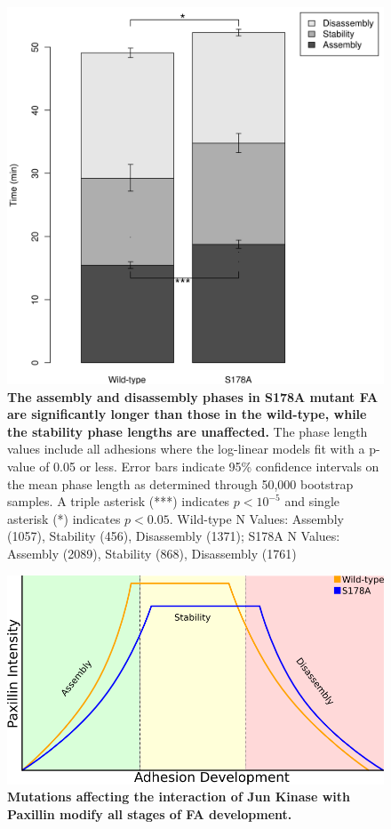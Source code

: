 \begin{figure}[htbp]
\begin{center}
\includegraphics[width=\textwidth]{../figures/lifetimes/adhesion_phase_lifetimes}
\end{center}
\caption{
{\bf The assembly and disassembly phases in S178A mutant FA are significantly
longer than those in the wild-type, while the stability phase lengths are
unaffected.} The phase length values include all adhesions where the log-linear
models fit with a p-value of 0.05 or less.  Error bars indicate 95\% confidence
intervals on the mean phase length as determined through 50,000 bootstrap
samples. A triple asterisk (***) indicates $p<10^{-5}$ and single asterisk (*)
indicates $p<0.05$. Wild-type N Values: Assembly (1057), Stability (456),
Disassembly (1371); S178A N Values: Assembly (2089), Stability (868),
Disassembly (1761)
}
\label{lifetimes}
\end{figure}

\begin{figure}[htbp]
\begin{center}
\includegraphics[width=\textwidth]{../figures/S178A/sample_timecourse}
\end{center}
\caption{
{\bf Mutations affecting the interaction of Jun Kinase with Paxillin modify all
stages of FA development.}  }
\label{summary}
\end{figure}
